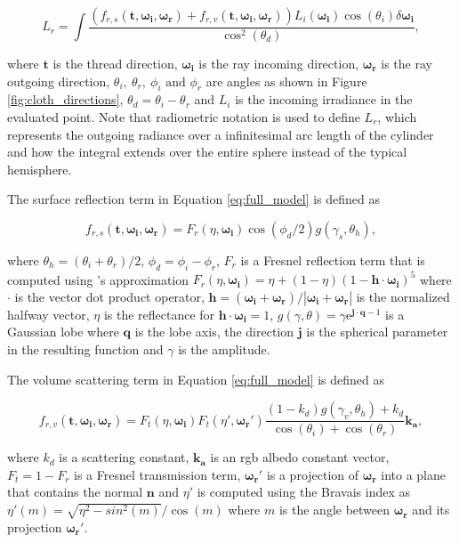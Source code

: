 \documentclass[12pt]{article}
\newcommand{\omegai}{\boldsymbol{\omega_i}}
\newcommand{\omegar}{\boldsymbol{\omega_r}}
\newcommand{\tb}{\mathbf{t}}
\begin{document}
\begin{equation}
L_r = \int \frac{\left(f_{r,s}(\tb, \omegai, \omegar) + f_{r,v}(\tb,\omegai,\omegar)\right)L_i(\omegai)\cos(\theta_i)\delta \omegai}{\cos^2(\theta_d)},
\label{eq:full_model}
\end{equation}

where $\tb$ is the thread direction, $\omegai$ is the ray incoming direction, $\omegar$ is the ray outgoing direction, $\theta_i, ~\theta_r, ~ \phi_i \mbox{ and } \phi_r$ are angles as shown in Figure \ref{fig:cloth_directions},  $\theta_d = \theta_i-\theta_r$ and $L_i$ is the incoming irradiance in the evaluated point.
Note that radiometric notation \cite{Marschner2003} is used to define $L_r$, which represents the outgoing radiance over a infinitesimal arc length of the cylinder and how the integral extends over the entire sphere instead of the typical hemisphere.

The surface reflection term in Equation \ref{eq:full_model} is defined as

\begin{equation}
f_{r,s}(\tb, \omegai, \omegar) = F_r(\eta, \omegai) \cos(\phi_d/2)g(\gamma_s, \theta_h),
\end{equation}

where $\theta_h = (\theta_i+\theta_r)/2$, $\phi_d = \phi_i-\phi_r$, $F_r$ is a Fresnel reflection term that is computed using \citeauthor{Schlick1994}'s approximation \cite{Schlick1994} $F_r(\eta, \omegai) = \eta + (1 - \eta)(1 - \mathbf{h} \cdot \omegai)^5$ where $\cdot$ is the vector dot product operator, $\mathbf{h} = (\omegai + \omegar)/ \left|\omegai + \omegar \right|$ is the normalized halfway vector, $\eta$ is the reflectance for $\mathbf{h} \cdot \omegai = 1$, $g(\gamma, \theta) = \gamma \mathrm{e} ^{\mathbf{j} \cdot \mathbf{q}-1}$ is a Gaussian lobe \cite{Wang2009} where $\mathbf{q}$ is the lobe axis, the direction $\mathbf{j}$ is the spherical parameter in the resulting function and $\gamma$ is the amplitude.

The volume scattering term in Equation \ref{eq:full_model} is defined as

\begin{equation}
f_{r,v}(\tb,\omegai,\omegar) = F_t(\eta, \omegai) F_t(\eta', \omegar') \frac{(1-k_d)g(\gamma_v, \theta_h)+k_d}{\cos(\theta_i) + \cos(\theta_r)} \mathbf{k_a},
\end{equation}

where $k_d$ is a scattering constant, $\mathbf{k_a}$ is an rgb albedo constant vector, $F_t = 1 - F_r$ is a Fresnel transmission term, $\omegar'$ is a projection of $\omegar$ into a plane that contains the normal $\mathbf{n}$ and $\eta'$ is computed using the Bravais index \cite{Marschner2003} as $\eta'(m) = \sqrt{\eta^2 - sin^2(m)}  / \cos(m)$ where $m$ is the angle between $\omegar$ and its projection $\omegar'$.
\end{document}

